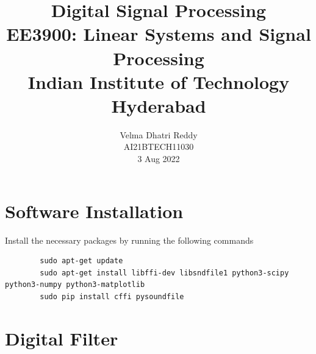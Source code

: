 \documentclass[journal,12pt,twocolumn]{IEEEtran}
\title{Digital Signal Processing \\ \Large EE3900: Linear Systems and Signal Processing \\ \large Indian Institute of Technology Hyderabad}
\author{Velma Dhatri Reddy \\ \normalsize AI21BTECH11030 \\ \vspace*{10pt} \normalsize 3 Aug 2022}
\numberwithin{equation}{section}
\begin{document}
	\maketitle
	
	\section{Software Installation}
	Install the necessary packages by running the following commands
	\begin{lstlisting}
		sudo apt-get update
		sudo apt-get install libffi-dev libsndfile1 python3-scipy  python3-numpy python3-matplotlib 
		sudo pip install cffi pysoundfile 
	\end{lstlisting}

	\section{Digital Filter}
\end{document}
